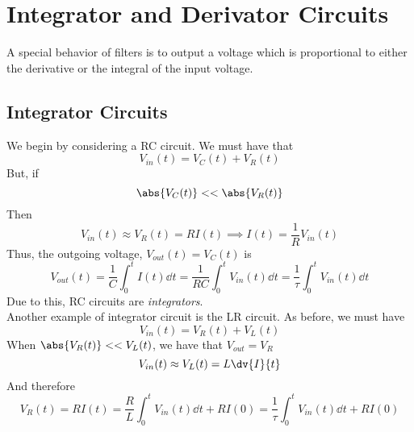 \documentclass[../electromagnetism.tex]{subfiles}
\begin{document}
\section{Integrator and Derivator Circuits}
A special behavior of filters is to output a voltage which is proportional to either the derivative or the integral of the input voltage.\\
\subsection{Integrator Circuits}
We begin by considering a RC circuit. We must have that
\begin{equation*}
	V_{in}(t)=V_{C}(t)+V_R(t)
\end{equation*}
But, if
\begin{equation*}
	\abs{V_C(t)}<<\abs{V_R(t)}
\end{equation*}
Then 
\begin{equation*}
	V_{in}(t)\approx V_{R}(t)=RI(t)\implies I(t)=\frac{1}{R}V_{in}(t)
\end{equation*}
Thus, the outgoing voltage, $V_{out}(t)=V_C(t)$ is
\begin{equation}
	V_{out}(t)=\frac{1}{C}\int_{0}^{t}I(t)\dd^{}{t}=\frac{1}{RC}\int_{0}^{t}V_{in}(t)\dd^{}{t}=\frac{1}{\tau}\int_{0}^{t}V_{in}(t)\dd^{}{t}
	\label{eq:outgoingrc.int}
\end{equation}
Due to this, RC circuits are \textit{integrators}.\\
Another example of integrator circuit is the LR circuit. As before, we must have
\begin{equation*}
	V_{in}(t)=V_{R}(t)+V_{L}(t)
\end{equation*}
When $\abs{V_R(t)}<<V_{L}(t)$, we have that $V_{out}=V_R$
\begin{equation*}
	V_{in}(t)\approx V_L(t)=L\dv{I}{t}
\end{equation*}
And therefore
\begin{equation}
	V_{R}(t)=RI(t)=\frac{R}{L}\int_{0}^{t}V_{in}(t)\dd^{}{t}+RI(0)=\frac{1}{\tau}\int_{0}^{t}V_{in}(t)\dd^{}{t}+RI(0)
	\label{eq:outgoinglr.int}
\end{equation}
\end{document}
